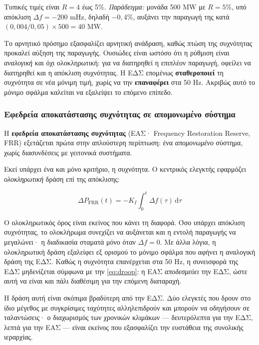Τυπικές τιμές είναι $R = 4$ έως 5\%. \emph{Παράδειγμα:} μονάδα 500 MW με $R = 5\%$, υπό
απόκλιση $\Delta f = -200$ mHz, δηλαδή $-0{,}4\%$, αυξάνει την παραγωγή της κατά
$(0{,}004/0{,}05) \times 500 = 40$ MW.

Το αρνητικό πρόσημο εξασφαλίζει αρνητική ανάδραση, καθώς πτώση της συχνότητας προκαλεί
αύξηση της παραγωγής. Ουσιώδες είναι ωστόσο ότι η ρύθμιση είναι \emph{αναλογική} και όχι
ολοκληρωτική: για να διατηρηθεί η επιπλέον παραγωγή, οφείλει να διατηρηθεί και η απόκλιση
συχνότητας. Η ΕΔΣ επομένως \textbf{σταθεροποιεί} τη συχνότητα σε νέα μόνιμη
τιμή, χωρίς να την \textbf{επαναφέρει} στα 50 Hz. Ακριβώς αυτό το μόνιμο σφάλμα
καλείται να εξαλείψει το επόμενο επίπεδο.

\subsubsection*{Εφεδρεία αποκατάστασης συχνότητας σε απομονωμένο σύστημα}

Η \textbf{εφεδρεία αποκατάστασης συχνότητας} (ΕΑΣ· Frequency Restoration Reserve, FRR) εξετάζεται
πρώτα στην απλούστερη περίπτωση: ένα \emph{απομονωμένο} σύστημα, χωρίς διασυνδέσεις με
γειτονικά συστήματα.

Εκεί υπάρχει ένα και μόνο κριτήριο, η συχνότητα. Ο κεντρικός ελεγκτής εφαρμόζει
\emph{ολοκληρωτική} δράση επί της απόκλισης:

\begin{equation}
\Delta P_{\mathrm{FRR}}(t) = -K_I \int_0^{t} \Delta f(\tau)\,\mathrm{d}\tau
\label{eq:frr-isolated}
\end{equation}

Ο ολοκληρωτικός όρος είναι εκείνος που κάνει τη διαφορά. Όσο υπάρχει απόκλιση συχνότητας,
το ολοκλήρωμα συνεχίζει να αυξάνεται και η εντολή παραγωγής να μεγαλώνει· η διαδικασία
σταματά μόνο όταν $\Delta f = 0$. Με άλλα λόγια, η ολοκληρωτική δράση εξαλείφει εξ ορισμού
το μόνιμο σφάλμα που αφήνει η αναλογική δράση της ΕΔΣ. Καθώς η συχνότητα επανέρχεται στα
50 Hz, η συνεισφορά της ΕΔΣ μηδενίζεται σύμφωνα με την \eqref{eq:droop}: η ΕΑΣ
\emph{αποδεσμεύει} την ΕΔΣ, ώστε αυτή να είναι
και πάλι διαθέσιμη για την επόμενη διαταραχή.

Η δράση αυτή είναι σκόπιμα βραδύτερη από την ΕΔΣ. Δύο ελεγκτές που δρουν στο ίδιο μέγεθος με
συγκρίσιμες ταχύτητες αλληλεπιδρούν και μπορούν να οδηγήσουν σε ταλαντώσεις· ο διαχωρισμός
των χρονικών κλιμάκων — δευτερόλεπτα για την ΕΔΣ, λεπτά για την ΕΑΣ — είναι εκείνος που
εξασφαλίζει την ευστάθεια της συνολικής ιεραρχίας.

